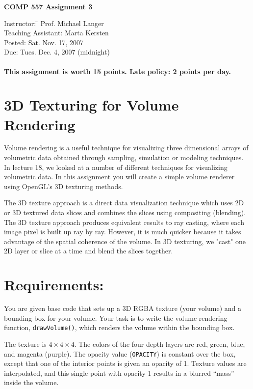 \documentclass[12pt]{article}
\begin{document}
\begin{center}
{\bf {\Large COMP 557 \hspace{1cm} Assignment 3} }
\end{center}

\begin{tabbing}
Instructor: \= \hspace{2cm} \= Prof. Michael Langer\\
Teaching Assistant: \> \> Marta Kersten  \\
Posted: \> \> Sat. Nov. 17, 2007   \\
Due:   \> \> Tues.  Dec. 4, 2007  (midnight) \\ \\
{\bf This assignment is worth 15 points.   Late policy:  2 points per day.} 
\end{tabbing}


\section*{3D Texturing for Volume Rendering}

Volume rendering is a useful technique for visualizing three
dimensional arrays of volumetric data obtained through sampling,
simulation or modeling techniques. In lecture 18, we looked at a
number of different techniques for visualizing volumetric data. In
this assignment you will create a simple volume renderer using
OpenGL's 3D texturing methods.


The 3D texture approach is a direct data visualization technique which
uses 2D or 3D textured data slices and combines the slices using
compositing (blending). The 3D texture approach produces equivalent
results to ray casting, where each image pixel is built up ray by ray.
However, it is much quicker because it takes advantage of the spatial
coherence of the volume. In 3D texturing, we "cast" one 2D layer or
slice at a time and blend the slices together.

\section*{Requirements:}

You are given base code that sets up a 3D RGBA texture (your volume)
and a bounding box for your volume. Your task is to write the volume
rendering function, {\tt drawVolume()}, which renders the volume
within the bounding box.

The texture is $4 \times 4 \times 4$.  The colors of the four depth
layers are red, green, blue, and magenta (purple).  The opacity value
({\tt OPACITY}) is constant over the box, except that one of the
interior points is given an opacity of 1.  Texture values are
interpolated, and this single point with opacity 1 
results in a blurred ``mass'' inside the volume.
\end{document}
